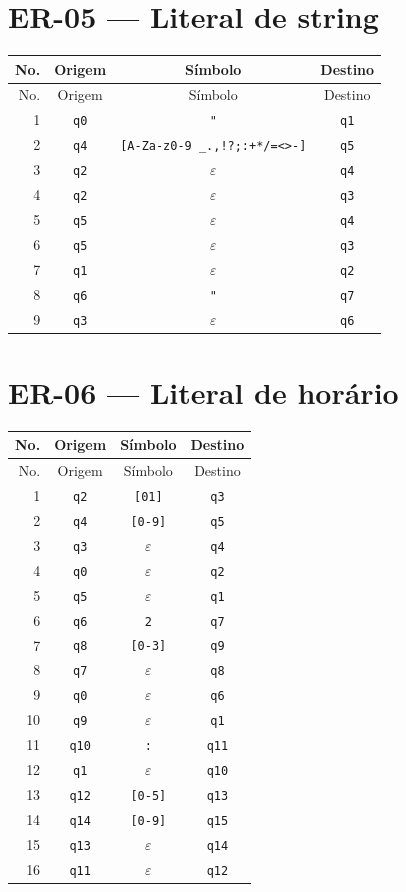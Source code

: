 \section{ER-05 --- Literal de string}
\small
\begin{longtable}{|r|c|c|c|}
\toprule
No. & Origem & Símbolo & Destino \\
\midrule
\endfirsthead
\toprule
No. & Origem & Símbolo & Destino \\
\midrule
\endhead
1 & \texttt{q0} & \texttt{"} & \texttt{q1} \\
2 & \texttt{q4} & \texttt{[A-Za-z0-9 \_.,!?;:+*/=<>-]} & \texttt{q5} \\
3 & \texttt{q2} & $\varepsilon$ & \texttt{q4} \\
4 & \texttt{q2} & $\varepsilon$ & \texttt{q3} \\
5 & \texttt{q5} & $\varepsilon$ & \texttt{q4} \\
6 & \texttt{q5} & $\varepsilon$ & \texttt{q3} \\
7 & \texttt{q1} & $\varepsilon$ & \texttt{q2} \\
8 & \texttt{q6} & \texttt{"} & \texttt{q7} \\
9 & \texttt{q3} & $\varepsilon$ & \texttt{q6} \\
\bottomrule
\end{longtable}
\section{ER-06 --- Literal de horário}
\small
\begin{longtable}{|r|c|c|c|}
\toprule
No. & Origem & Símbolo & Destino \\
\midrule
\endfirsthead
\toprule
No. & Origem & Símbolo & Destino \\
\midrule
\endhead
1 & \texttt{q2} & \texttt{[01]} & \texttt{q3} \\
2 & \texttt{q4} & \texttt{[0-9]} & \texttt{q5} \\
3 & \texttt{q3} & $\varepsilon$ & \texttt{q4} \\
4 & \texttt{q0} & $\varepsilon$ & \texttt{q2} \\
5 & \texttt{q5} & $\varepsilon$ & \texttt{q1} \\
6 & \texttt{q6} & \texttt{2} & \texttt{q7} \\
7 & \texttt{q8} & \texttt{[0-3]} & \texttt{q9} \\
8 & \texttt{q7} & $\varepsilon$ & \texttt{q8} \\
9 & \texttt{q0} & $\varepsilon$ & \texttt{q6} \\
10 & \texttt{q9} & $\varepsilon$ & \texttt{q1} \\
11 & \texttt{q10} & \texttt{:} & \texttt{q11} \\
12 & \texttt{q1} & $\varepsilon$ & \texttt{q10} \\
13 & \texttt{q12} & \texttt{[0-5]} & \texttt{q13} \\
14 & \texttt{q14} & \texttt{[0-9]} & \texttt{q15} \\
15 & \texttt{q13} & $\varepsilon$ & \texttt{q14} \\
16 & \texttt{q11} & $\varepsilon$ & \texttt{q12} \\
\bottomrule
\end{longtable}